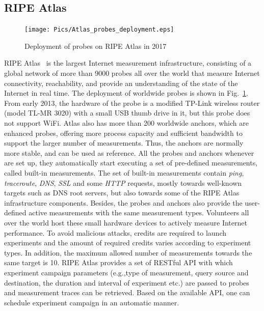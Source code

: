 \subsection{RIPE Atlas}
\label{subsec:atlas}
\begin{figure}[!t]
	\centering
	\texttt{[image: Pics/Atlas\_probes\_deployment.eps]}
	\caption{Deployment of probes on RIPE Atlas in 2017}
	\label{Atlas_probes_deployment}
\end{figure}

RIPE Atlas~\cite{atlas} is the largest Internet measurement infrastructure, consisting of a global network of more than 9000 probes all over the world that measure Internet connectivity, reachability, and provide an understanding of the state of the Internet in real time. The deployment of worldwide probes is shown in Fig.~\ref{Atlas_probes_deployment}. From early 2013, the hardware of the probe is a modified TP-Link wireless router (model TL-MR 3020) with a small USB thumb drive in it, but this probe does not support WiFi. Atlas also has more than 200 worldwide anchors, which are enhanced probes, offering more process capacity and sufficient bandwidth to support the larger number of measurements. Thus, the anchors are normally more stable, and can be used as reference. All the probes and anchors whenever are set up, they automatically start executing a set of pre-defined measurements, called built-in measurements. The set of built-in measurements contain \emph{ping}, \emph{traceroute}, \emph{DNS}, \emph{SSL} and some \emph{HTTP} requests, mostly towards well-known targets such as DNS root servers, but also towards some of the RIPE Atlas infrastructure components. Besides, the probes and anchors also provide the user-defined active measurements with the same measurement types. Volunteers all over the world host these small hardware devices to actively measure Internet performance. To avoid malicious attacks, credits are required to launch experiments and the amount of required credits varies according to experiment types. In addition, the maximum allowed number of measurements towards the same target is 10. RIPE Atlas provides a set of RESTful API with which experiment campaign parameters (e.g.,type of measurement, query source and destination, the duration and interval of experiment etc.) are passed to probes and measurement traces can be retrieved. Based on the available API, one can schedule experiment campaign in an automatic manner.

